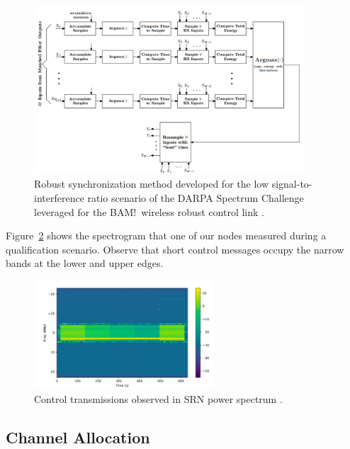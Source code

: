 \documentclass[11pt]{article}
\begin{document}
\begin{figure} [htb]
     \centerline{
     \includegraphics[width = 0.9\textwidth]{Figures/NDASync.png}}
     \caption{Robust synchronization method developed for the low signal-to-interference ratio scenario of the DARPA Spectrum Challenge leveraged for the BAM!\ wireless robust control link \cite[Figure $4$]{func-report}.}
     \label{fig:shortcontrol}
     \end{figure}
     
Figure~\ref{fig:controlband} shows the spectrogram that one of our nodes measured during a qualification scenario. Observe that short control messages occupy the narrow bands at the lower and upper edges. 

\begin{figure} [htb]
     \centerline{
     \includegraphics[width = 0.6\textwidth]{Figures/CCEx.png}}
     \caption{Control transmissions observed in SRN power spectrum \cite[Figure $5$]{func-report}.}
     \label{fig:controlband}
     \end{figure}
     
\subsection{Channel Allocation}
\label{s-chan_alloc}
\end{document}
